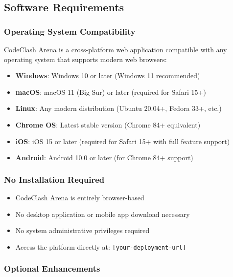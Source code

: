 \documentclass[12pt]{article}
\begin{document}
\subsection{Software Requirements}

\subsubsection{Operating System Compatibility}

CodeClash Arena is a cross-platform web application compatible with any operating system that supports modern web browsers:

\begin{itemize}
\item \textbf{Windows}: Windows 10 or later (Windows 11 recommended)
\item \textbf{macOS}: macOS 11 (Big Sur) or later (required for Safari 15+)
\item \textbf{Linux}: Any modern distribution (Ubuntu 20.04+, Fedora 33+, etc.)
\item \textbf{Chrome OS}: Latest stable version (Chrome 84+ equivalent)
\item \textbf{iOS}: iOS 15 or later (required for Safari 15+ with full feature support)
\item \textbf{Android}: Android 10.0 or later (for Chrome 84+ support)
\end{itemize}

\subsubsection{No Installation Required}

\begin{itemize}
\item CodeClash Arena is entirely browser-based
\item No desktop application or mobile app download necessary
\item No system administrative privileges required
\item Access the platform directly at: \texttt{[your-deployment-url]}
\end{itemize}

\subsubsection{Optional Enhancements}
\end{document}

